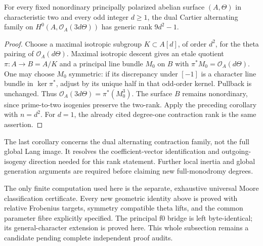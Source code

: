 \begin{corollary}
\label{cor:fixed-ppav-all-odd-maximal-dual-Cartier}
For every fixed nonordinary principally polarized abelian surface
\((A,\Theta)\) in characteristic two and every odd integer
\(d\ge1\), the dual Cartier alternating family on
\(H^0(A,\mathcal O_A(3d\Theta))\) has generic rank
\(9d^2-1\).
\end{corollary}
\begin{proof}
Choose a maximal isotropic subgroup \(K\subset A[d]\), of order
\(d^2\), for the theta pairing of \(\mathcal O_A(d\Theta)\).
Maximal isotropic descent gives an etale quotient
\(\pi:A\to B=A/K\) and a principal line bundle \(M_0\) on
\(B\) with \(\pi^*M_0=\mathcal O_A(d\Theta)\).
One may choose \(M_0\) symmetric: if its discrepancy under
\([-1]\) is a character line bundle in \(\ker\pi^*\), adjust
by its unique half in that odd-order kernel.  Pullback is unchanged.
Thus \(\mathcal O_A(3d\Theta)=\pi^*(M_0^3)\).
The surface \(B\) remains nonordinary, since prime-to-two isogenies
preserve the two-rank.  Apply the preceding corollary with
\(n=d^2\).  For \(d=1\), the already cited degree-one contraction
rank is the same assertion.
\end{proof}

\begin{remark}
\label{rem:ppav-twisted-Cartier-Moore-scope}
The last corollary concerns the dual alternating contraction family,
not the full global Lang image.  It resolves the coefficient-vector
identification and outgoing-isogeny direction needed for this rank
statement.  Further local inertia and global generation arguments
are required before claiming new full-monodromy degrees.

The only finite computation used here is the separate, exhaustive
universal Moore classification certificate.  Every new geometric
identity above is proved with relative Frobenius targets, symmetry
compatible theta lifts, and the common parameter fibre explicitly
specified.  The principal f0 bridge is left byte-identical; its
general-character extension is proved here.  This whole subsection
remains a candidate pending complete independent proof audits.
\end{remark}
